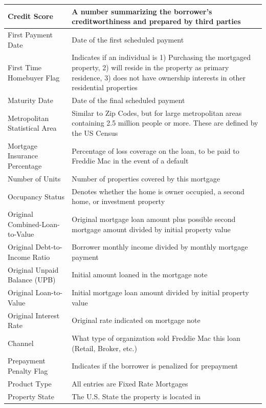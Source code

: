 \documentclass[12 pt]{uncw_thesis}
\theoremstyle{plain}
\theoremstyle{remark}
\theoremstyle{definition}
\begin{document}
\begin{center}
	\begin{longtable}{ |M{5.5cm}|M{8.75cm}| }
		\hline
		Credit Score & A number summarizing the borrower's creditworthiness and prepared by third parties\\ \hline
		First Payment Date & Date of the first scheduled payment\\ \hline
		First Time Homebuyer Flag & Indicates if an individual is 1) Purchasing the mortgaged property, 2) will reside in the property as primary residence, 3) does not have ownership interests in other residential properties \\
		\hline
		Maturity Date & Date of the final scheduled payment\\
		\hline
		Metropolitan Statistical Area & Similar to Zip Codes, but for large metropolitan areas containing 2.5 million people or more. These are defined by the US Census\\
		\hline
		Mortgage Insurance Percentage & Percentage of loss coverage on the loan, to be paid to Freddie Mac in the event of a default\\
		\hline
		Number of Units & Number of properties covered by this mortgage\\
		\hline
		Occupancy Status & Denotes whether the home is owner occupied, a second home, or investment property\\
		\hline
		Original Combined-Loan-to-Value & Original mortgage loan amount plus possible second mortgage amount divided by initial property value\\ 
		\hline
		Original Debt-to-Income Ratio & Borrower monthly income divided by monthly mortgage payment \\
		\hline
		Original Unpaid Balance (UPB) & Initial amount loaned in the mortgage note\\
		\hline
		Original Loan-to-Value & Initial mortgage loan amount divided by initial property value\\
		\hline
		Original Interest Rate & Original rate indicated on mortgage note\\
		\hline
		Channel & What type of organization sold Freddie Mac this loan (Retail, Broker, etc.)\\
		\hline
		Prepayment Penalty Flag & Indicates if the borrower is penalized for prepayment\\
		\hline
		Product Type & All entries are Fixed Rate Mortgages\\
		\hline
		Property State & The U.S. State the property is located in\\

\end{longtable}
\end{center}
\end{document}
